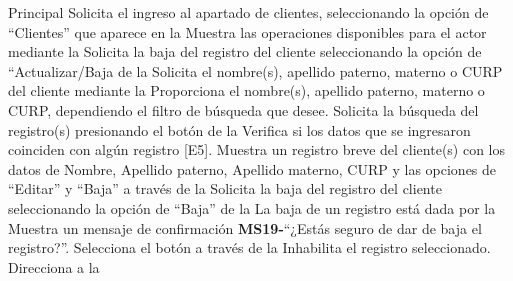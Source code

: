 	\begin{UCtrayectoria}{Principal}
		\UCpaso[\UCactor] Solicita el ingreso al apartado de clientes, seleccionando la opción de ``Clientes'' que aparece en la 
		\UCpaso Muestra las operaciones disponibles para el actor mediante la 
		\UCpaso[\UCactor] Solicita la baja del registro del cliente seleccionando la opción de ``Actualizar/Baja de la 
		\UCpaso Solicita el nombre(s), apellido paterno, materno o CURP del cliente mediante la 
		\UCpaso[\UCactor] Proporciona el nombre(s), apellido paterno, materno o CURP, dependiendo el filtro de búsqueda que desee.
		\UCpaso[\UCactor] Solicita la búsqueda del registro(s) presionando el botón  de la 
		\UCpaso Verifica si los datos que se ingresaron coinciden con algún registro [E5].
		\UCpaso Muestra un registro breve del cliente(s) con los datos de Nombre, Apellido paterno, Apellido materno, CURP y las opciones de ``Editar'' y ``Baja'' a través de la 
		\UCpaso[\UCactor] Solicita la baja del registro del cliente seleccionando la opción de ``Baja'' de la  La baja de un registro está dada por la  
		\UCpaso Muestra un mensaje de confirmación {\bf MS19-}``¿Estás seguro de dar de baja el registro?''.
		\UCpaso[\UCactor] Selecciona el botón  a través de la 
		\UCpaso Inhabilita el registro seleccionado.
		\UCpaso Direcciona a la 
	\end{UCtrayectoria}
	
